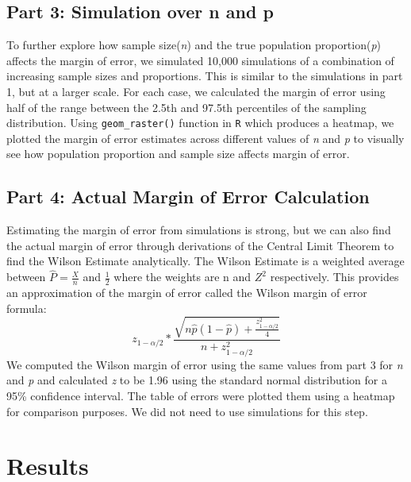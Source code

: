 \documentclass{article}\usepackage[]{graphicx}\usepackage[]{xcolor}
\begin{document}
\begin{multicols}{2}
\subsection{Part 3: Simulation over n and p}

To further explore how sample size(\emph{n}) and the true population proportion(\emph{p}) affects the margin of error, we simulated 10,000 simulations of a combination of increasing sample sizes and proportions. This is similar to the simulations in part 1, but at a larger scale. For each case, we calculated the margin of error using half of the range between the 2.5th and 97.5th percentiles of the sampling distribution. Using \texttt{geom\_raster()} function in \texttt{R} which produces a heatmap, we plotted the margin of error estimates across different values of \emph{n} and \emph{p} to visually see how population proportion and sample size affects margin of error.

\subsection{Part 4: Actual Margin of Error Calculation}

Estimating the margin of error from simulations is strong, but we can also find the actual margin of error through derivations of the Central Limit Theorem to find the Wilson Estimate analytically. The Wilson Estimate is a weighted average between \(\hat{P} = \frac{X}{n}\) and \(\frac{1}{2}\) where the weights are n and \(Z^2\) respectively. This provides an approximation of the margin of error called the Wilson margin of error formula:
$$
z_{1 - \alpha/2} * \frac{ \sqrt{n \hat{p} (1 - \hat{p}) + \frac{z_{1 - \alpha/2}^2}{4}} }{n + z_{1 - \alpha/2}^2}
$$
We computed the Wilson margin of error using the same values from part 3 for \emph{n} and \emph{p} and calculated \emph{z} to be 1.96 using the standard normal distribution for a 95\% confidence interval. The table of errors were plotted them using a heatmap for comparison purposes. We did not need to use simulations for this step.



\section{Results}

\end{multicols}
\end{document}

